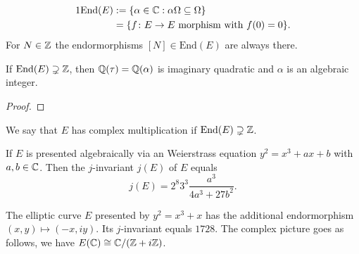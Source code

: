 \documentclass{beamer}
\begin{document}
\begin{frame}
  \begin{alignat*}1
    \mathrm{End}(E) &:= \{\alpha\in \IC : \alpha \Omega\subset
    \Omega\}\\
    &= \{f\colon E\rightarrow E \text{ morphism with
    }f(0)=0\}.    
  \end{alignat*}
  For $N\in{\mathbb{Z}}$ the endormorphisms $[N] \in \mathrm{End}(E)$ are
  always there.
  
  \begin{lemma}
    If $\mathrm{End}(E) \supsetneq {\mathbb{Z}}$, then
    ${\mathbb{Q}}(\tau)={\mathbb{Q}}(\alpha)$
    is imaginary
    quadratic and $\alpha$ is an algebraic integer. 
  \end{lemma}
  \begin{proof}
    \bigskip\bigskip\bigskip\bigskip\bigskip\bigskip\bigskip
  \end{proof}
\end{frame}

\begin{frame}
  \begin{definition}
    We say that $E$ has \alert{complex multiplication} if
    $\mathrm{End}(E)\supsetneq {\mathbb{Z}}$. 
  \end{definition}

  \begin{definition}
    If $E$ is presented algebraically via an Weierstrass equation $y^2 =
    x^3+ax+b$ with $a,b\in{\mathbb{C}}$. Then the \alert{$j$-invariant} $j(E)$ of $E$ equals
    \begin{equation*}
      j(E) = 2^8 3^3 \frac{a^3}{4a^3+27b^2}. 
    \end{equation*}  
  \end{definition}

  \begin{example}
    The elliptic curve $E$ presented by $y^2=x^3+x$ has the additional
    endormorphism
    $(x,y)\mapsto (-x, i y)$. Its $j$-invariant equals $1728$. The
    complex picture goes as follows, we have $E({\mathbb{C}})\cong {\mathbb{C}}/({\mathbb{Z}}+i
    {\mathbb{Z}})$. 
  \end{example}
\end{frame}
\end{document}
